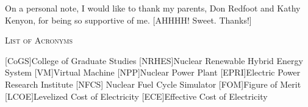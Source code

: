 \documentclass[12pt]{UIdahoMastersThesis}
\begin{document}
On a personal note, I would like to thank my parents, Don Redfoot and Kathy Kenyon, for being so supportive of me.  [AHHHH! Sweet. Thanks!]

\newpage


   
   


\tableofcontents
\newpage








\begin{center}
	{\LARGE\textsc{List of Acronyms}}
\end{center}

\begin{acronym}[NRHES]  %
    [CoGS]{College of Graduate Studies}
    [NRHES]{Nuclear Renewable Hybrid Energy System}
    [VM]{Virtual Machine}  %
    [NPP]{Nuclear Power Plant}
    [EPRI]{Electric Power Research Institute}
    [NFCS] {Nuclear Fuel Cycle Simulator}
    [FOM]{Figure of Merit}
    [LCOE]{Levelized Cost of Electricity}
    [ECE]{Effective Cost of Electricity}
\end{acronym}
\end{document}
